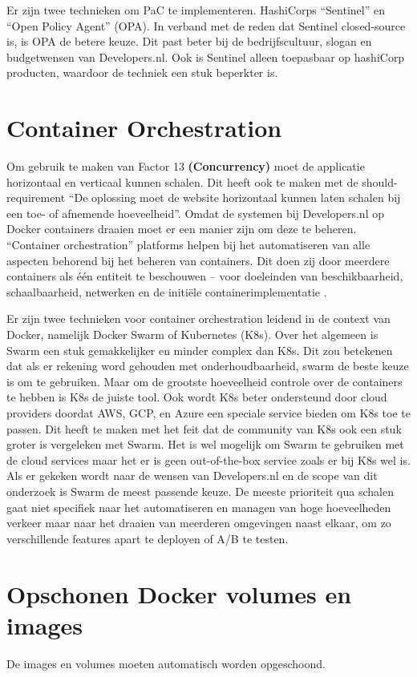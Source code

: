 Er zijn twee technieken om PaC te implementeren. HashiCorps \enquote{Sentinel} en \enquote{Open Policy Agent} (OPA). In verband met de reden dat Sentinel closed-source is, is OPA de betere keuze. Dit past beter bij de bedrijfscultuur, slogan en budgetwensen van Developers.nl. Ook is Sentinel alleen toepasbaar op hashiCorp producten, waardoor de techniek een stuk beperkter is.

\section{Container Orchestration}
\label{ContainerOrchestration}
Om gebruik te maken van Factor 13 \textbf{(Concurrency)} moet de applicatie horizontaal en verticaal kunnen schalen. Dit heeft ook te maken met de should-requirement \enquote{De oplossing moet de website horizontaal kunnen laten schalen bij een toe- of afnemende hoeveelheid}. Omdat de systemen bij Developers.nl op Docker containers draaien moet er een manier zijn om deze te beheren. \enquote{Container orchestration} platforms helpen bij het automatiseren van alle aspecten behorend bij het beheren van containers. Dit doen zij door meerdere containers als één entiteit te beschouwen -- voor doeleinden van beschikbaarheid, schaalbaarheid, netwerken en de initiële containerimplementatie \parencite{ContainerOrchestration}.

Er zijn twee technieken voor container orchestration leidend in de context van Docker, namelijk Docker Swarm of Kubernetes (K8s). Over het algemeen is Swarm een stuk gemakkelijker en minder complex dan K8s. Dit zou betekenen dat als er rekening word gehouden met onderhoudbaarheid, swarm de beste keuze is om te gebruiken. Maar om de grootste hoeveelheid controle over de containers te hebben is K8s de juiste tool. Ook wordt K8s beter ondersteund door cloud providers doordat AWS, GCP, en Azure een speciale service bieden om K8s toe te passen. Dit heeft te maken met het feit dat de community van K8s ook een stuk groter is vergeleken met Swarm. Het is wel mogelijk om Swarm te gebruiken met de cloud services maar het er is geen out-of-the-box service zoals er bij K8s wel is. Als er gekeken wordt naar de wensen van Developers.nl en de scope van dit onderzoek is Swarm de meest passende keuze. De meeste prioriteit qua schalen gaat niet specifiek naar het automatiseren en managen van hoge hoeveelheden verkeer maar naar het draaien van meerderen omgevingen naast elkaar, om zo verschillende features apart te deployen of A/B te testen.

\section{Opschonen Docker volumes en images}
De images en volumes moeten automatisch worden opgeschoond.

